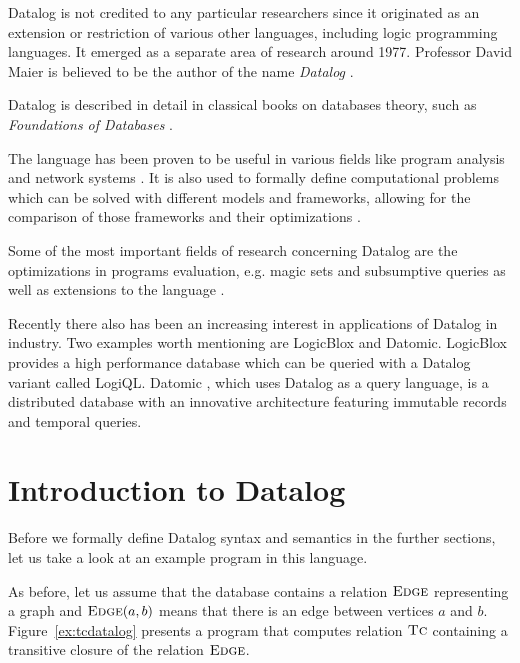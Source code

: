 Datalog is not credited to any particular researchers since it originated as an extension or restriction of various other languages, including logic programming languages. It emerged as a separate area of research around 1977. Professor David Maier is believed to be the author of the name \emph{Datalog} \cite{fod}.

Datalog is described in detail in classical books on databases theory, such as \emph{Foundations of Databases} \cite{fod}.

The language has been proven to be useful in various fields like program analysis \cite{pointanalysis} and network systems \cite{boomanalysis, dataloganalysis}. It is also used to formally define computational problems which can be solved with different models and frameworks, allowing for the comparison of those frameworks and their optimizations \cite{ullman}. 

Some of the most important fields of research concerning Datalog are the optimizations in programs evaluation, e.g. magic sets \cite{magicsets} and subsumptive queries \cite{subsumptivequeries} as well as extensions to the language \cite{magicsetsexist, disjunctivedatalog, datalogrelaunched}.

Recently there also has been an increasing interest in applications of Datalog in industry. Two examples worth mentioning are LogicBlox and Datomic. LogicBlox \cite{logicblox} provides a high performance database which can be queried with a Datalog variant called LogiQL.  Datomic \cite{datomic}, which uses Datalog as a query language, is a distributed database with an innovative architecture featuring immutable records and temporal queries.

\section{Introduction to Datalog}

Before we formally define Datalog syntax and semantics in the further sections, let us take a look at an example program in this language.

As before, let us assume that the database contains a relation $\textsc{Edge}$ representing a graph and $\textsc{Edge}(a, b)$ means that there is an edge between vertices $a$ and $b$. Figure~\ref{ex:tcdatalog} presents a program that computes relation $\textsc{Tc}$ containing a transitive closure of the relation $\textsc{Edge}$.


